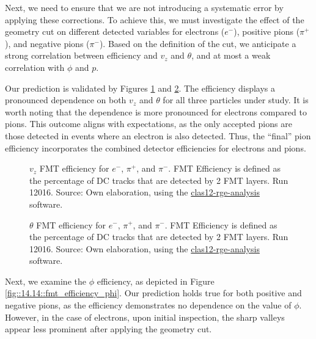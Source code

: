     Next, we need to ensure that we are not introducing a systematic error by applying these corrections.
    To achieve this, we must investigate the effect of the geometry cut on different detected variables for electrons ($e^-$), positive pions ($\pi^+$), and negative pions ($\pi^-$).
    Based on the definition of the cut, we anticipate a strong correlation between efficiency and $v_z$ and $\theta$, and at most a weak correlation with $\phi$ and $p$.

    Our prediction is validated by Figures \ref{fig::14.14::fmt_efficiency_vz} and \ref{fig::14.14::fmt_efficiency_theta}.
    The efficiency displays a pronounced dependence on both $v_z$ and $\theta$ for all three particles under study.
    It is worth noting that the dependence is more pronounced for electrons compared to pions.
    This outcome aligns with expectations, as the only accepted pions are those detected in events where an electron is also detected.
    Thus, the ``final'' pion efficiency incorporates the combined detector efficiencies for electrons and pions.

    \begin{figure}[t!]
        \centering{}
        \caption[$v_z$ FMT efficiency for $e^-$, $\pi^+$, and $\pi^-$.
        Run 12016]{$v_z$ FMT efficiency for $e^-$, $\pi^+$, and $\pi^-$.
        FMT Efficiency is defined as the percentage of DC tracks that are detected by 2 FMT layers.
        Run 12016.
        Source: Own elaboration, using the \hyperlink{github.com/bleaktwig/clas12-rge-analysis}{clas12-rge-analysis} software.}
        \label{fig::14.14::fmt_efficiency_vz}
    \end{figure}

    \begin{figure}[t!]
        \centering{}
        \caption[$\theta$ FMT efficiency for $e^-$, $\pi^+$, and $\pi^-$.
        Run 12016]{$\theta$ FMT efficiency for $e^-$, $\pi^+$, and $\pi^-$.
        FMT Efficiency is defined as the percentage of DC tracks that are detected by 2 FMT layers.
        Run 12016.
        Source: Own elaboration, using the \hyperlink{github.com/bleaktwig/clas12-rge-analysis}{clas12-rge-analysis} software.}
        \label{fig::14.14::fmt_efficiency_theta}
    \end{figure}

    Next, we examine the $\phi$ efficiency, as depicted in Figure \ref{fig::14.14::fmt_efficiency_phi}.
    Our prediction holds true for both positive and negative pions, as the efficiency demonstrates no dependence on the value of $\phi$.
    However, in the case of electrons, upon initial inspection, the sharp valleys appear less prominent after applying the geometry cut.

